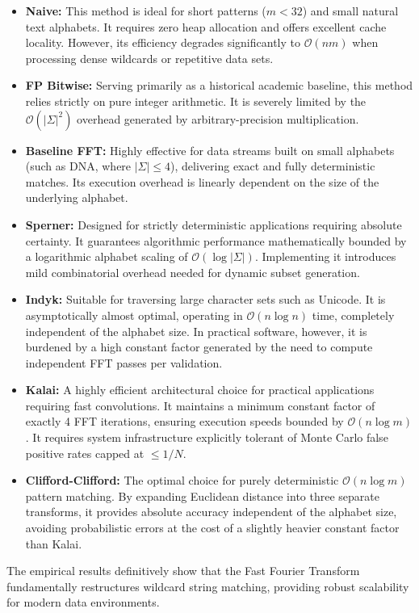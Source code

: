 \begin{itemize}
    \item \textbf{Naive:} This method is ideal for short patterns ($m < 32$) and small natural text alphabets. It requires zero heap allocation and offers excellent cache locality. However, its efficiency degrades significantly to $\mathcal{O}(nm)$ when processing dense wildcards or repetitive data sets.
    
    \item \textbf{FP Bitwise:} Serving primarily as a historical academic baseline, this method relies strictly on pure integer arithmetic. It is severely limited by the $\mathcal{O}(|\Sigma|^2)$ overhead generated by arbitrary-precision multiplication.
    
    \item \textbf{Baseline FFT:} Highly effective for data streams built on small alphabets (such as DNA, where $|\Sigma| \le 4$), delivering exact and fully deterministic matches. Its execution overhead is linearly dependent on the size of the underlying alphabet.
    
    \item \textbf{Sperner:} Designed for strictly deterministic applications requiring absolute certainty. It guarantees algorithmic performance mathematically bounded by a logarithmic alphabet scaling of $\mathcal{O}(\log |\Sigma|)$. Implementing it introduces mild combinatorial overhead needed for dynamic subset generation.
    
    \item \textbf{Indyk:} Suitable for traversing large character sets such as Unicode. It is asymptotically almost optimal, operating in $\mathcal{O}(n \log n)$ time, completely independent of the alphabet size. In practical software, however, it is burdened by a high constant factor generated by the need to compute independent FFT passes per validation.
    
    \item \textbf{Kalai:} A highly efficient architectural choice for practical applications requiring fast convolutions. It maintains a minimum constant factor of exactly 4 FFT iterations, ensuring execution speeds bounded by $\mathcal{O}(n \log m)$. It requires system infrastructure explicitly tolerant of Monte Carlo false positive rates capped at $\le 1/N$.
    
    \item \textbf{Clifford-Clifford:} The optimal choice for purely deterministic $\mathcal{O}(n \log m)$ pattern matching. By expanding Euclidean distance into three separate transforms, it provides absolute accuracy independent of the alphabet size, avoiding probabilistic errors at the cost of a slightly heavier constant factor than Kalai.
\end{itemize}

The empirical results definitively show that the Fast Fourier Transform fundamentally restructures wildcard string matching, providing robust scalability for modern data environments.
